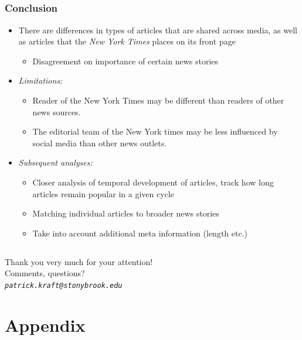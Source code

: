 \documentclass{beamer}
\begin{document}
\subsection{}
\begin{frame}%
  \frametitle{Conclusion}
  \begin{itemize}
\item There are differences in types of articles that are shared across media, as well as articles that the \emph{New York Times} places on its front page
\begin{itemize}
\item Disagreement on importance of certain news stories
\end{itemize}
\item \emph{Limitations:}
\begin{itemize}
\item Reader of the New York Times may be different than readers of other news sources.
\item The editorial team of the New York times may be less influenced by social media than other news outlets.
\end{itemize}
\item \emph{Subsequent analyses:}
\begin{itemize}
\item Closer analysis of temporal development of articles, track how long articles remain popular in a given cycle
\item Matching individual articles to broader news stories
\item Take into account additional meta information (length etc.)
\end{itemize}
  \end{itemize}
\end{frame}

\subsection{}
\begin{frame}%
  \begin{center}
  \large{Thank you very much for your attention!}\\ \vspace{2em}
  Comments, questions?\\
  \emph{\texttt{patrick.kraft@stonybrook.edu}}
  \end{center}
\end{frame}

\section{Appendix}
\end{document}
